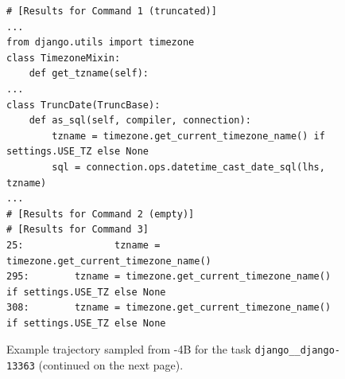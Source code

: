 \begin{figure}[!ht]
\begin{tcolorbox}[colback=orange!5!white, colframe=orange!75!black, title={\small Observation 2 (trimmed)}]
\begin{lstlisting}[basicstyle=\fontsize{7.5}{8.5}\ttfamily, breaklines=true]
# [Results for Command 1 (truncated)]
...
from django.utils import timezone
class TimezoneMixin:
    def get_tzname(self):
...
class TruncDate(TruncBase):
    def as_sql(self, compiler, connection):
        tzname = timezone.get_current_timezone_name() if settings.USE_TZ else None
        sql = connection.ops.datetime_cast_date_sql(lhs, tzname)
...
# [Results for Command 2 (empty)]
# [Results for Command 3]
25:                tzname = timezone.get_current_timezone_name()
295:        tzname = timezone.get_current_timezone_name() if settings.USE_TZ else None
308:        tzname = timezone.get_current_timezone_name() if settings.USE_TZ else None
\end{lstlisting}
\end{tcolorbox}
\caption{Example trajectory sampled from \methodname-4B for the task \texttt{django\_\_django-13363} (continued on the next page).}
\label{fig:traj_4b_p1}
\end{figure}


